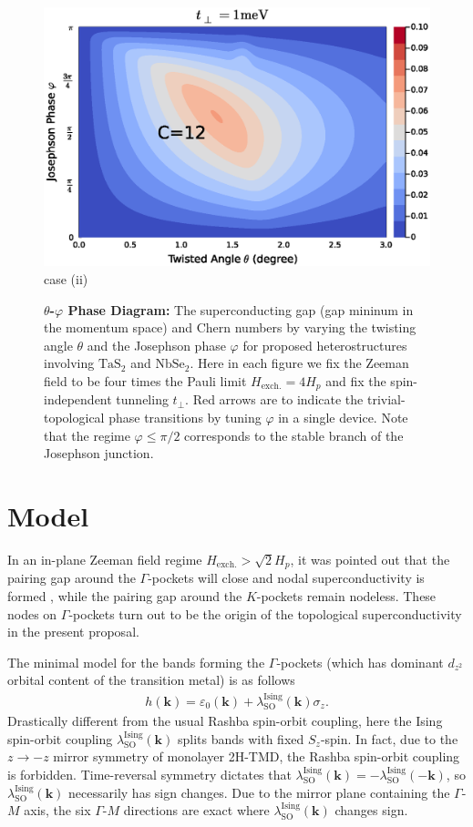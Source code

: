 \begin{figure}
\begin{minipage}{1.0\textwidth}
            \includegraphics[width=0.29\linewidth]{contents/Ising_Top/figures/gap_size_distribution.NbSe2.theta_phi.non-magnetic.t=1.eps}
            \\
            case (ii)
        \end{minipage}
        \caption{{\bf $\theta$-$\varphi$ Phase Diagram:} The superconducting gap (gap mininum in the momentum space) and Chern numbers by varying the twisting angle $\theta$ and the Josephson phase $\varphi$ for proposed heterostructures involving $\mathrm{TaS_2}$ and $\mathrm{NbSe_2}$. Here in each figure we fix the Zeeman field to be four times the Pauli limit $H_{\text{exch.}}=4H_p$ and fix the spin-independent tunneling $t_\perp$. Red arrows are to indicate the trivial-topological phase transitions by tuning $\varphi$ in a single device. Note that the regime $\varphi\leq \pi/2$ corresponds to the stable branch of the Josephson junction.}
        \label{fig:theta-phi phase digram}
\end{figure}

\section{Model}
In an in-plane Zeeman field regime $H_{\text{exch.}}>\sqrt{2}H_p$, it was pointed out that the pairing gap around the $\Gamma$-pockets will close and nodal superconductivity is formed \cite{he2018magnetic}, while the pairing gap around the $K$-pockets remain nodeless. These nodes on $\Gamma$-pockets turn out to be the origin of the topological superconductivity in the present proposal. 

The minimal model for the bands forming the $\Gamma$-pockets (which has dominant $d_{z^2}$ orbital content of the transition metal) is as follows
\begin{align}
    h(\bm k)=\varepsilon_0(\bm k)+\lambda^{\text{Ising}}_{\mathrm{SO}}(\bm k) \sigma_z.
\end{align}
Drastically different from the usual Rashba spin-orbit coupling, here the Ising spin-orbit coupling $\lambda^{\text{Ising}}_{\mathrm{SO}}(\bm k)$ splits bands with fixed $S_z$-spin. In fact, due to the $z\rightarrow -z$ mirror symmetry of monolayer 2H-TMD, the Rashba spin-orbit coupling is forbidden. Time-reversal symmetry dictates that $\lambda^{\text{Ising}}_{\mathrm{SO}}(\bm k)=-\lambda^{\text{Ising}}_{\mathrm{SO}}(-\bm k)$, so $\lambda^{\text{Ising}}_{\mathrm{SO}}(\bm k)$ necessarily has sign changes. Due to the mirror plane containing the $\Gamma$-$M$ axis, the six $\Gamma$-$M$ directions are exact where $\lambda^{\text{Ising}}_{\mathrm{SO}}(\bm k)$ changes sign. 

